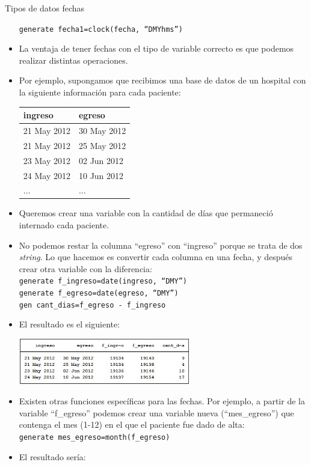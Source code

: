 \documentclass{beamer}
\begin{document}
\begin{frame}[allowframebreaks]{Tipos de datos fechas}
\begin{itemize}
\texttt{generate fecha1=clock(fecha, ``DMYhms'')}
\item La ventaja de tener fechas con el tipo de variable correcto es que podemos realizar distintas operaciones. 
\item Por ejemplo, supongamos que recibimos una base de datos de un hospital con la siguiente información para cada paciente:\\\medskip
{\footnotesize
\begin{center}
\begin{tabular}{p{2cm} p{2cm}}
\hline
ingreso&egreso\\\hline
21 May 2012& 30 May 2012\\
21 May 2012& 25 May 2012\\
23 May 2012& 02 Jun 2012\\
24 May 2012& 10 Jun 2012\\
...&...\\
\hline
\end{tabular}
\end{center}}
\item Queremos crear una variable con la cantidad de días que permaneció internado cada paciente.
\item No podemos restar la columna ``egreso'' con ``ingreso'' porque se trata de dos \textit{string}. Lo que hacemos es convertir cada columna en una fecha, y después crear otra variable con la diferencia: \\
\texttt{generate f\_ingreso=date(ingreso, ``DMY'')}\\
\texttt{generate f\_egreso=date(egreso, ``DMY'')}\\
\texttt{gen cant\_dias=f\_egreso - f\_ingreso}
\item El resultado es el siguiente: \\\medskip
\centerline{\includegraphics[height=2cm]{dias.jpg}}
\item Existen otras funciones específicas para las fechas. Por ejemplo, a partir de la variable ``f\_egreso'' podemos crear una variable nueva (``mes\_egreso'') que contenga el mes (1-12) en el que el paciente fue dado de alta:\\\smallskip
\texttt{generate mes\_egreso=month(f\_egreso)}
\item El resultado sería:\\\medskip

\end{itemize}
\end{frame}
\end{document}
